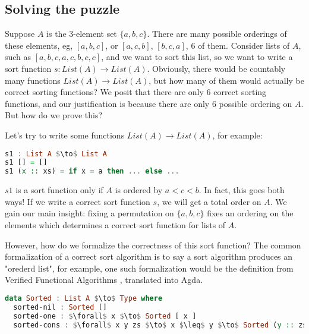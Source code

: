 \subsection*{Solving the puzzle}

Suppose $A$ is the 3-element set $\{a,b,c\}$. There are many possible orderings of these elements,
eg, $[a,b,c]$, or $[a,c,b]$, $[b,c,a]$, 6 of them.
Consider lists of $A$, such as $[a,b,c,a,c,b,c,c]$, and we want to sort this list, so we want to write a sort function $s\colon List(A) \to List(A)$.
Obviously, there would be countably many functions $List(A) \to List(A)$, but how many of them
would actually be correct sorting functions? We posit that there are only 6 correct sorting
functions, and our justification is because there are only 6 possible ordering on $A$.
But how do we prove this?

Let's try to write some functions $List(A) \to List(A)$, for example:
\begin{lstlisting}[language=haskell]
s1 : List A $\to$ List A
s1 [] = []
s1 (x :: xs) = if x = a then ... else ...
\end{lstlisting}
$s1$ is a sort function only if $A$ is ordered by $a < c < b$.
In fact, this goes both ways!
If we write a correct sort function $s$, we will get a total order on $A$.
We gain our main insight: fixing a permutation on $\{a,b,c\}$ fixes an ordering on the elements which determines a correct sort function for lists of $A$.


However, how do we formalize the correctness of this sort function?
The common formalization of a correct sort algorithm is to say a sort algorithm produces
an "orederd list", for example, one such formalization would be the definition
from Verified Functional Algorithms \cite{appelVerifiedFunctionalAlgorithms2023}, translated into Agda.

\begin{lstlisting}[language=Haskell]
data Sorted : List A $\to$ Type where
  sorted-nil : Sorted []
  sorted-one : $\forall$ x $\to$ Sorted [ x ]
  sorted-cons : $\forall$ x y zs $\to$ x $\leq$ y $\to$ Sorted (y :: zs) $\to$ Sorted (x :: y :: zs)
\end{lstlisting}

